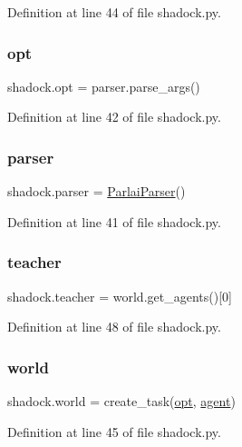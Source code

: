 Definition at line 44 of file shadock.\+py.

\mbox{\label{namespaceshadock_a1f0720d3750ae2bb3fbbaad0fd0e33ae}} 
\subsubsection{\texorpdfstring{opt}{opt}}
{\footnotesize\ttfamily shadock.\+opt = parser.\+parse\+\_\+args()}



Definition at line 42 of file shadock.\+py.

\mbox{\label{namespaceshadock_aa4e07d2eebb7832812fa751fcc89196b}} 
\subsubsection{\texorpdfstring{parser}{parser}}
{\footnotesize\ttfamily shadock.\+parser = \hyperlink{classparlai_1_1core_1_1params_1_1ParlaiParser}{Parlai\+Parser}()}



Definition at line 41 of file shadock.\+py.

\mbox{\label{namespaceshadock_abc8ed101017c61d6a944f70094e73277}} 
\subsubsection{\texorpdfstring{teacher}{teacher}}
{\footnotesize\ttfamily shadock.\+teacher = world.\+get\+\_\+agents()\mbox{[}0\mbox{]}}



Definition at line 48 of file shadock.\+py.

\mbox{\label{namespaceshadock_a7a57065851adb01a5966c61a702b2748}} 
\subsubsection{\texorpdfstring{world}{world}}
{\footnotesize\ttfamily shadock.\+world = create\+\_\+task(\hyperlink{namespaceshadock_a1f0720d3750ae2bb3fbbaad0fd0e33ae}{opt}, \hyperlink{namespaceshadock_ad75e4ea6fe08d47d4a18de24b6bc2455}{agent})}



Definition at line 45 of file shadock.\+py.

